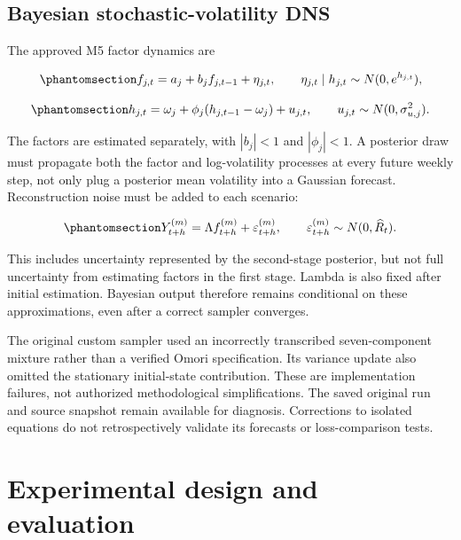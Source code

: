 \documentclass[
  12pt,
  letterpaper,
  DIV=11,
  numbers=noendperiod]{scrreprt}
\begin{document}
\section{Bayesian stochastic-volatility
DNS}\label{bayesian-stochastic-volatility-dns}

The approved M5 factor dynamics are

\begin{equation}\protect\phantomsection\label{eq-sv-factor}{
f_{j,t}=a_j+b_j f_{j,t-1}+\eta_{j,t},
\qquad \eta_{j,t}\mid h_{j,t}\sim N(0,e^{h_{j,t}}),
}\end{equation}

\begin{equation}\protect\phantomsection\label{eq-sv-state}{
h_{j,t}=\omega_j+\phi_j(h_{j,t-1}-\omega_j)+u_{j,t},
\qquad u_{j,t}\sim N(0,\sigma_{u,j}^2).
}\end{equation}

The factors are estimated separately, with \(|b_j|<1\) and
\(|\phi_j|<1\). A posterior draw must propagate both the factor and
log-volatility processes at every future weekly step, not only plug a
posterior mean volatility into a Gaussian forecast. Reconstruction noise
must be added to each scenario:

\begin{equation}\protect\phantomsection\label{eq-predictive}{
Y_{t+h}^{(m)}=\Lambda f_{t+h}^{(m)}+\varepsilon_{t+h}^{(m)},
\qquad \varepsilon_{t+h}^{(m)}\sim N(0,\widehat R_t).
}\end{equation}

This includes uncertainty represented by the second-stage posterior, but
not full uncertainty from estimating factors in the first stage. Lambda
is also fixed after initial estimation. Bayesian output therefore
remains conditional on these approximations, even after a correct
sampler converges.

The original custom sampler used an incorrectly transcribed
seven-component mixture rather than a verified Omori specification. Its
variance update also omitted the stationary initial-state contribution.
These are implementation failures, not authorized methodological
simplifications. The saved original run and source snapshot remain
available for diagnosis. Corrections to isolated equations do not
retrospectively validate its forecasts or loss-comparison tests.

\chapter{Experimental design and evaluation}\label{sec-design}
\end{document}
